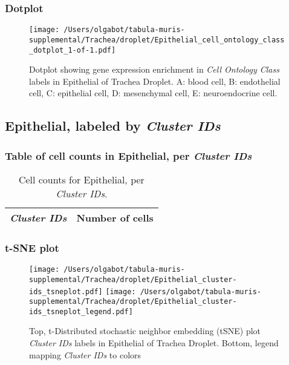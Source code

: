\clearpage

\subsubsection{Dotplot}
\begin{figure}[h]
\centering
\texttt{[image: /Users/olgabot/tabula-muris-supplemental/Trachea/droplet/Epithelial\_cell\_ontology\_class\_dotplot\_1-of-1.pdf]}

\caption{ Dotplot  showing gene expression enrichment in \emph{Cell Ontology Class} labels in Epithelial of Trachea Droplet. A: blood cell, B: endothelial cell, C: epithelial cell, D: mesenchymal cell, E: neuroendocrine cell.}
\end{figure}


\clearpage

\subsection{Epithelial, labeled by \emph{Cluster IDs}}
\subsubsection{Table of cell counts in Epithelial, per \emph{Cluster IDs}}\begin{table}[h]
\centering
\label{my-label}
\begin{tabular}{@{}ll@{}}
\toprule

\emph{Cluster IDs}& Number of cells \\ \midrule\bottomrule
\end{tabular}
\caption{Cell counts for Epithelial, per \emph{Cluster IDs}.}
\end{table}

\clearpage
\subsubsection{t-SNE plot}
\begin{figure}[h]
\centering
\texttt{[image: /Users/olgabot/tabula-muris-supplemental/Trachea/droplet/Epithelial\_cluster-ids\_tsneplot.pdf]}
\texttt{[image: /Users/olgabot/tabula-muris-supplemental/Trachea/droplet/Epithelial\_cluster-ids\_tsneplot\_legend.pdf]}
\caption{Top, t-Distributed stochastic neighbor embedding (tSNE) plot  \emph{Cluster IDs} labels in Epithelial of Trachea Droplet. Bottom, legend mapping \emph{Cluster IDs} to colors}
\end{figure}


